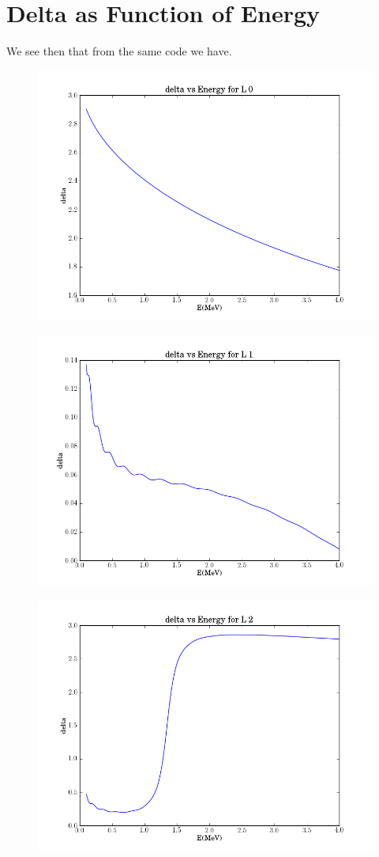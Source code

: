 \documentclass[11pt]{article} %
\begin{document}
\newpage
\section{Delta as Function of Energy}
We see then that from the same code we have.\\

\vspace{1mm}
\begin{figure}[H]
\centering
\includegraphics[width=.5\linewidth]{"deltavenL0"}
\end{figure}
\vspace{1mm}


\vspace{1mm}
\begin{figure}[H]
\centering
\includegraphics[width=.5\linewidth]{"deltavenL1"}
\end{figure}
\vspace{1mm}


\vspace{1mm}
\begin{figure}[H]
\centering
\includegraphics[width=.5\linewidth]{"deltavenL2"}
\end{figure}
\vspace{1mm}
\end{document}
